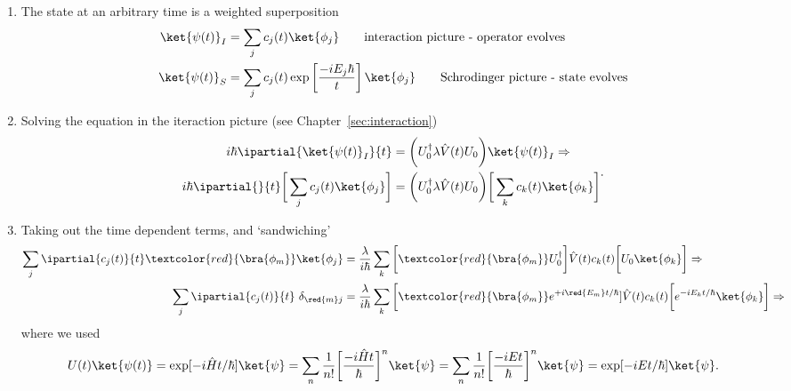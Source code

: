 \begin{enumerate}
\item The state at an arbitrary time is a weighted superposition
  \begin{equation}
    \label{eqn:pertStates}
    \begin{aligned}
      \ket{\psi(t)}_I & = \sum_j c_j(t)\ket{\phi_j}\qquad\hfill\text{interaction picture - operator evolves}\\
      \ket{\psi(t)}_S               &                =               \sum_j
      c_j(t)\exp\left[\frac{-iE_j\hbar}{t}\right]\ket{\phi_j}\qquad
      \hfill\text{Schrodinger picture - state evolves}
    \end{aligned}
  \end{equation}
\item Solving the  \schrodinger equation in the  iteraction picture (see
  Chapter~\ref{sec:interaction})
  \begin{equation}
    \begin{aligned}
      i\hbar\ipartial{\ket{\psi(t)}_I}{t} & = \bigg(U_0^\dagger\lambda\hat{V}(t)U_0\bigg)\ket{\psi(t)}_I \Rightarrow\\
      i\hbar\ipartial{}{t}\bigg[\sum_j c_j(t)\ket{\phi_j}\bigg] & = \bigg(U_0^\dagger\lambda\hat{V}(t)U_0\bigg)\bigg[\sum_k c_k(t)\ket{\phi_k}\bigg]\\
    \end{aligned}.
  \end{equation}
\item Taking out the time dependent terms, and `sandwiching'
  \begin{equation}
    \begin{aligned}
      \sum_j \ipartial{c_j(t)}{t}\textcolor{red}{\bra{\phi_m}}\ket{\phi_j} & = \frac{\lambda}{i\hbar} \sum_k \bigg[ \textcolor{red}{\bra{\phi_m}}U_0^\dagger\bigg]\hat{V}(t)c_k(t)\bigg[U_0\ket{\phi_k}\bigg]\Rightarrow\\
      \sum_j \ipartial{c_j(t)}{t}\ \delta_{\red{m}j} & = \frac{\lambda}{i\hbar} \sum_k \bigg[ \textcolor{red}{\bra{\phi_m}}e^{+i\red{E_m}t/\hbar}]\hat{V}(t)c_k(t)\bigg[e^{-iE_kt/\hbar}\ket{\phi_k}\bigg] \Rightarrow\\
    \end{aligned}
  \end{equation}
  \noindent where we used
  \begin{equation}
    U(t)\ket{\psi(t)} = \exp[-i\hat{H}t/\hbar]\ket{\psi} = \sum_n\frac{1}{n!}\bigg[\frac{-i\hat{H}t}{\hbar}\bigg]^n\ket{\psi} = \sum_n\frac{1}{n!}\bigg[\frac{-iEt}{\hbar}\bigg]^n\ket{\psi} = \exp[-iEt/\hbar]\ket{\psi}.

\end{equation}
\end{enumerate}

